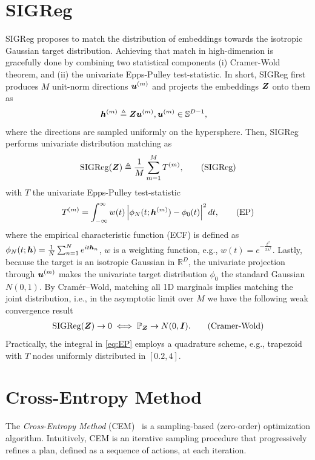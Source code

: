 
\section{SIGReg}
\label{appendix:sigreg}
SIGReg proposes to match the distribution of embeddings towards the isotropic Gaussian target distribution. Achieving that match in high-dimension is gracefully done by combining two statistical components (i) Cramer-Wold theorem, and (ii) the univariate Epps-Pulley test-statistic. In short, SIGReg first produces $M$ unit-norm directions ${\bm{u}}^{(m)}$ and projects the embeddings ${\bm{Z}}$ onto them as
\begin{align}
    {\bm{h}}^{(m)}&\triangleq {\bm{Z}}{\bm{u}}^{(m)},{\bm{u}}^{(m)}\in\mathbb{S}^{D-1},\label{eq:h}
\end{align}
where the directions are sampled uniformly on the hypersphere. Then, SIGReg performs univariate distribution matching as
\begin{align}
    {\rm SIGReg}({\bm{Z}})\triangleq \frac{1}{M}\sum_{m=1}^{M}T^{(m)},\tag{SIGReg}\label{eq:SIGreg}
\end{align}
with $T$ the univariate Epps-Pulley test-statistic
\begin{equation}
T^{(m)} = \int_{-\infty}^{\infty} w(t) \left|\phi_N(t; {\bm{h}}^{(m)}) - \phi_0(t)\right|^2 dt,\tag{EP}\label{eq:EP}
\end{equation}
where the empirical characteristic function (ECF) is defined as $
\phi_N(t; {\bm{h}}) = \frac{1}{N}\sum_{n=1}^N e^{it {\bm{h}}_n}$, $w$ is a weighting function, e.g., $w(t) = e^{-\frac{t^2}{2\lambda^2}}$. Lastly, because the target is an isotropic Gaussian in $\mathbb{R}^D$, the univariate projection through ${\bm{u}}^{(m)}$ makes the univariate target distribution $\phi_0$ the standard Gaussian $N(0,1)$. By Cramér–Wold, matching all 1D marginals implies matching the joint distribution, i.e., in the asymptotic limit over $M$ we have the following weak convergence result
\begin{align}
    {\rm SIGReg}({\bm{Z}})\rightarrow 0 \iff \mathbb{P}_{\bm{Z}}\rightarrow N(0,{\bm{I}}).\tag{Cramer-Wold}
\end{align}
Practically, the integral in \eqref{eq:EP} employs a quadrature scheme, e.g., trapezoid with $T$ nodes uniformly distributed in $[0.2,4]$.

\section{Cross-Entropy Method}
\label{appendix:solver}

The \textit{Cross-Entropy Method} (CEM)~\cite{rubinstein2004cross} is a sampling-based (zero-order) optimization algorithm. Intuitively, CEM is an iterative sampling procedure that progressively refines a plan, defined as a sequence of actions, at each iteration.

